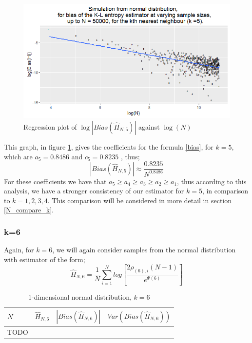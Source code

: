 \documentclass{article}
\begin{document}
\begin{figure}
  \begin{center}
    \includegraphics[width=\textwidth]{./Graphs/Normal_k=5_plot.png}
  \end{center} 
\caption{Regression plot of $\log|Bias(\hat{H}_{N, 5})|$ against $\log(N)$}
  \label{normal_k=5_graph}
\end{figure}

This graph, in figure \ref{normal_k=5_graph}, gives the coefficients for the formula \ref{bias}, for $k=5$, which are $a_{5} = 0.8486$ and $c_{5} = 0.8235$ , thus;
\begin{equation}
|Bias(\hat{H}_{N, 5})| \approx \frac{0.8235}{N^{0.8486}} \nonumber
\end{equation}
For these coefficients we have that $a_{5} \geq a_{4} \geq a_{3} \geq a_{2} \geq a_{1}$, thus according to this analysis, we have a stronger consistency of our estimator for $k=5$, in comparison to $k=1, 2, 3, 4$. This comparison will be considered in more detail in section \ref{N_compare_k}.



\subsubsection{k=6} \label{N_k=6}
Again, for $k=6$, we will again consider samples from the normal distribution with estimator of the form;
\begin{equation}
\hat{H}_{N, 6} = \frac{1}{N} \sum_{i=1}^{N} log \left[ \frac{2\rho_{(6),i} (N-1)}{e^{\Psi(6)}} \right] \nonumber
\end{equation}

\begin{table}
\caption{1-dimensional normal distribution, $k=6$} \label{normal_k=6_table}
\begin{center}
\begin{tabular}{| l | c c c|} 
\toprule
$N$ & $\hat{H}_{N, 6}$ & $|Bias(\hat{H}_{N, 6})|$ & $Var(Bias(\hat{H}_{N, 6}))$ \\
\midrule[1pt]
TODO & & & \\
\hline
\end{tabular}
\end{center}
\end{table}
\end{document}
